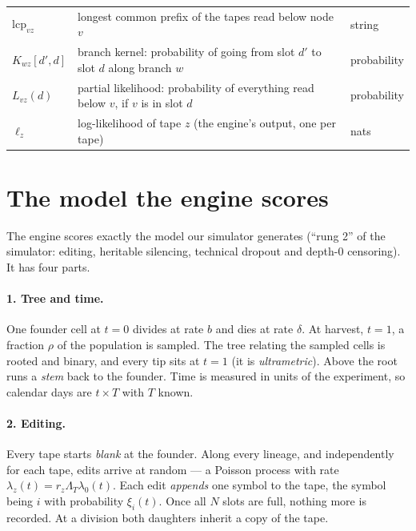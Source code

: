 \documentclass[11pt]{article}
\newcommand{\LamT}{\Lambda_T}
\newcommand{\lcp}{\mathrm{lcp}}
\begin{document}
\begin{center}
\begin{tabular}{@{}lp{}l@{}}
$\lcp_{vz}$ & longest common prefix of the tapes read below node $v$ & string \\
$K_{wz}[d',d]$ & branch kernel: probability of going from slot $d'$ to slot $d$ along branch $w$ & probability \\
$L_{vz}(d)$ & partial likelihood: probability of everything read below $v$, if $v$ is in slot $d$ & probability \\
$\ell_z$ & log-likelihood of tape $z$ (the engine's output, one per tape) & nats \\
\bottomrule
\end{tabular}
\end{center}

\section{The model the engine scores}\label{sec:model}

The engine scores exactly the model our simulator generates (``rung 2'' of the simulator: editing,
heritable silencing, technical dropout and depth-0 censoring). It has four parts.

\paragraph{1. Tree and time.} One founder cell at $t=0$ divides at rate $b$ and dies at rate
$\delta$. At harvest, $t=1$, a fraction $\rho$ of the population is sampled. The tree relating the
sampled cells is rooted and binary, and every tip sits at $t=1$ (it is \emph{ultrametric}). Above the
root runs a \emph{stem} back to the founder. Time is measured in units of the experiment, so
calendar days are $t\times T$ with $T$ known.

\paragraph{2. Editing.} Every tape starts \emph{blank} at the founder. Along every lineage, and
independently for each tape, edits arrive at random --- a Poisson process with rate
$\lambda_z(t)=r_z\LamT\lambda_0(t)$. Each edit \emph{appends} one symbol to the tape, the symbol being
$i$ with probability $\xi_i(t)$. Once all $N$ slots are full, nothing more is recorded. At a
division both daughters inherit a copy of the tape.
\end{document}
